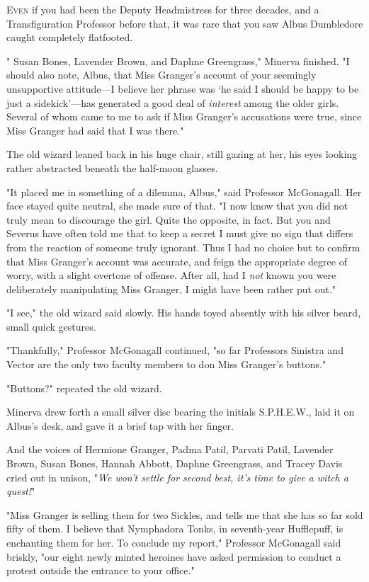 
\lettrine{E}{ven} if you had
been the Deputy Headmistress for three decades, and a Transfiguration Professor
before that, it was rare that you saw Albus Dumbledore caught completely
flatfooted.

"{\el} Susan Bones, Lavender Brown, and Daphne Greengrass," Minerva finished.
"I should also note, Albus, that Miss Granger's account of your seemingly
unsupportive attitude---I believe her phrase was `he said I should be happy to
be just a sidekick'---has generated a good deal of \emph{interest} among the
older girls. Several of whom came to me to ask if Miss Granger's accusations
were true, since Miss Granger had said that I was there."

The old wizard leaned back in his huge chair, still gazing at her, his eyes
looking rather abstracted beneath the half-moon glasses.

"It placed me in something of a dilemma, Albus," said Professor McGonagall. Her
face stayed quite neutral, she made sure of that. "I now know that you did not
truly mean to discourage the girl. Quite the opposite, in fact. But you and
Severus have often told me that to keep a secret I must give no sign that
differs from the reaction of someone truly ignorant. Thus I had no choice but
to confirm that Miss Granger's account was accurate, and feign the appropriate
degree of worry, with a slight overtone of offense. After all, had I \emph{not}
known you were deliberately manipulating Miss Granger, I might have been rather
put out."

"I{\el} see," the old wizard said slowly. His hands toyed absently with his
silver beard, small quick gestures.

"Thankfully," Professor McGonagall continued, "so far Professors Sinistra and
Vector are the only two faculty members to don Miss Granger's buttons."

"Buttons?" repeated the old wizard.

Minerva drew forth a small silver disc bearing the initials S.P.H.E.W., laid it
on Albus's desk, and gave it a brief tap with her finger.

And the voices of Hermione Granger, Padma Patil, Parvati Patil, Lavender Brown,
Susan Bones, Hannah Abbott, Daphne Greengrass, and Tracey Davis cried out in
unison, "\emph{We won't settle for second best, it's time to give a witch a
quest!}"

"Miss Granger is selling them for two Sickles, and tells me that she has so far
sold fifty of them. I believe that Nymphadora Tonks, in seventh-year
Hufflepuff, is enchanting them for her. To conclude my report," Professor
McGonagall said briskly, "our eight newly minted heroines have asked permission
to conduct a protest outside the entrance to your office."

